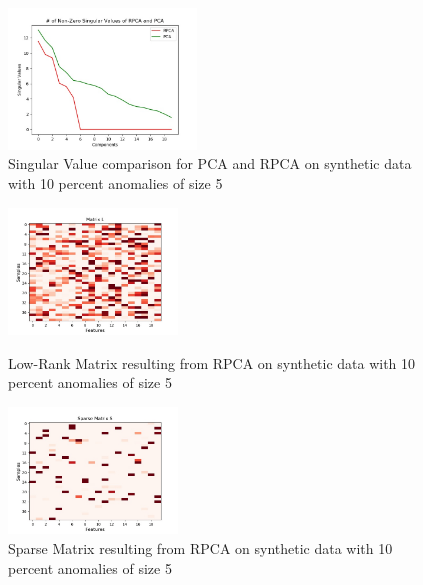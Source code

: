 \documentclass{article}
\begin{document}
\begin{figure}[H]
    \centering
    \includegraphics[width=50mm, scale=0.5]{Singular_Value_Plot_Test_400AnomSize5.jpg}
    \caption{Singular Value comparison for PCA and RPCA on synthetic data with 10 percent anomalies of size 5}
    \label{fig:singvaltrain4005}
\end{figure}
\begin{figure}[H]
\begin{minipage}[b]{0.45\linewidth}
    \centering
    \includegraphics[width=45mm, scale=0.5]{L_400AnomSize5.jpg}
    \caption{Low-Rank Matrix resulting from RPCA on synthetic data with 10 percent anomalies of size 5}
    \label{fig:Ltrain4005}
\end{minipage}
\quad
\begin{minipage}[b]{0.45\linewidth}
    \includegraphics[width=45mm, scale=0.5]{S_400AnomSize5.jpg}
    \caption{Sparse Matrix resulting from RPCA on synthetic data with 10 percent anomalies of size 5}
    \label{fig:Strain4005}
\end{minipage}
\end{figure}
\end{document}
